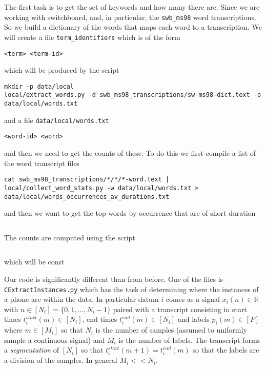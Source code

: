 \documentclass{article}
\begin{document}
The first task is to get the set of keywords and how many there are.
Since we are working with switchboard, and, in particular, the
\texttt{swb\_ms98} word transcriptions.  So we build a dictionary of
the words that maps each word to a transcription.
We will create a file \texttt{term\_identifiers} which is of the form
\begin{verbatim}
<term> <term-id>
\end{verbatim}
which will be produced by the script
\begin{verbatim}
mkdir -p data/local
local/extract_words.py -d swb_ms98_transcriptions/sw-ms98-dict.text -o data/local/words.txt
\end{verbatim}
and a file \texttt{data/local/words.txt}
\begin{verbatim}
<word-id> <word>
\end{verbatim}
and then we need to get the counts of these. To do this we first
compile a list of the word transcript files
\begin{verbatim}
cat swb_ms98_transcriptions/*/*/*-word.text | local/collect_word_stats.py -w data/local/words.txt > data/local/words_occurrences_av_durations.txt
\end{verbatim}
and then we want to get the top words by occurrence that are
of short duration
\begin{verbatim}

\end{verbatim}
 The counts are computed
using the script
\begin{verbatim}

\end{verbatim}
which will be const


Our code is significantly different than from before.  One of the files is \texttt{CExtractInstances.py}
which has the task of determining where the instances of a phone are within the data. In particular datum $i$ comes as 
a signal $x_i(n)\in\mathbb{R}$ with $n\in[N_i]=\{0,1,\ldots,N_i-1\}$ paired with a transcript consisting in start times $t_i^{start}(m)\in[N_i]$,
end times $t_i^{end}(m)\in[N_i]$ and labels $p_i(m)\in [P]$ where $m\in[M_i]$ so that $N_i$ is the number of samples (assumed to 
uniformly sample a continuous signal) and $M_i$ is the number of labels.  The transcript forms a \textit{segmentation} of
$[N_i]$ so that $t_i^{start}(m+1)=t_i^{end}(m)$ so that the labels are a division of the samples.  In general $M_i << N_i$.
\end{document}
